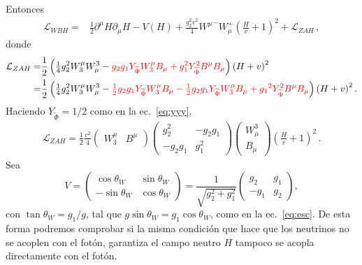 \begin{frame}

Entonces
\begin{align}
  \label{eq:96qft}
  \mathcal{L}_{WBH}=&\frac{1}{2}\partial^\mu H\partial_\mu H-V(H)
  +\frac{g_2^2v^2}{4}{W^\mu}^-W_\mu^+ \left( \frac{H}{v}+1 \right)^2+\mathcal{L}_{Z A H}\,,
\end{align}
donde
\begin{align}
  \mathcal{L}_{ZAH}=&\frac{1}{2}\left(\tfrac{1}{4}g_2^2W_3^\mu W^3_\mu-{\color{red}g_2{g_1}Y_{\widetilde{\Phi}} W_3^\mu B_\mu+g_1^2 Y_{\widetilde{\Phi}} ^2B^\mu B_\mu}\right)
\left(H+v\right)^2 \nonumber\\
  =&\frac{1}{2}\left(\tfrac{1}{4}g_2^2W_3^\mu W^3_\mu-{\color{red}\tfrac{1}{2}g_2{g_1}Y_{\widetilde{\Phi}} W_3^\mu B_\mu-\tfrac{1}{2}g_2{g_1}Y_{\widetilde{\Phi}} W_3^\mu B_\mu+{{g_1}}^2Y_{\widetilde{\Phi}} ^2B^\mu B_\mu}\right)
\left(H+v\right)^2.
\end{align}
Haciendo $Y_{\widetilde{\Phi}} =1/2$ como en la ec.~\eqref{eq:yyy},
\begin{align}
  \mathcal{L}_{ZAH}=\frac{1}{2}\frac{v^2}{4}
  \begin{pmatrix}
    W^\mu_3 & B^\mu
  \end{pmatrix}
  \begin{pmatrix}
    g^2_2&-g_2{g_1}\\
    -g_2{g_1}&g_1^2
  \end{pmatrix}
  \begin{pmatrix}
    W^3_\mu\\
    B_\mu
  \end{pmatrix}
\left(\frac{H}{v}+1\right)^2\,.
\end{align}
Sea
\begin{equation}
  V=\begin{pmatrix}
    \cos\theta_W & \sin\theta_W\\
    -\sin\theta_W& \cos\theta_W
  \end{pmatrix}=
  \frac{1}{\sqrt{g^2_2+g_1^2}}\begin{pmatrix}
    g_2   & {g_1}\\
    -{g_1} & g_2
  \end{pmatrix},
\end{equation}
con $\tan\theta_W={g_1}/g$, tal que $g\sin\theta_W={g_1}\cos\theta_W$, como en la ec.~\eqref{eq:esc}. De esta forma podremos comprobar si la misma condición que hace que los neutrinos no se acoplen con el fotón, garantiza el campo neutro $H$ tampoco se acopla directamente con el fotón. 


\end{frame}
